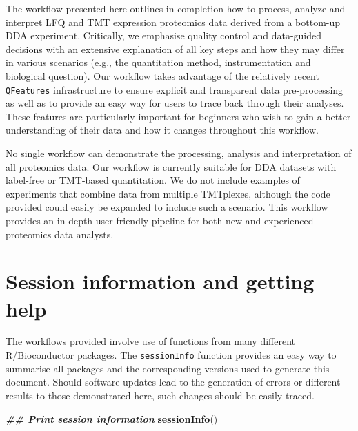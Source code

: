 \documentclass[9pt,a4paper,]{extarticle}
\newenvironment{Shaded}{\begin{snugshade}}{\end{snugshade}}
\newcommand{\DocumentationTok}[1]{\textcolor[rgb]{0.56,0.35,0.01}{\textbf{\textit{#1}}}}
\newcommand{\FunctionTok}[1]{\textcolor[rgb]{0.13,0.29,0.53}{\textbf{#1}}}
\newcommand{\NormalTok}[1]{#1}
\begin{document}
The workflow presented here outlines in completion how to process, analyze and
interpret LFQ and TMT expression proteomics data derived from a bottom-up DDA
experiment. Critically, we emphasise quality control and data-guided decisions
with an extensive explanation of all key steps and how they may differ in
various scenarios (e.g., the quantitation method, instrumentation and biological
question). Our workflow takes advantage of the relatively recent \texttt{QFeatures}
infrastructure to ensure explicit and transparent data pre-processing as well as
to provide an easy way for users to trace back through their analyses. These
features are particularly important for beginners who wish to gain a better
understanding of their data and how it changes throughout this workflow.

No single workflow can demonstrate the processing, analysis and interpretation
of all proteomics data. Our workflow is currently suitable for DDA datasets with
label-free or TMT-based quantitation. We do not include examples of experiments
that combine data from multiple TMTplexes, although the code provided could
easily be expanded to include such a scenario. This workflow provides an in-depth
user-friendly pipeline for both new and experienced proteomics data analysts.

\section{Session information and getting help}\label{session-information-and-getting-help}

The workflows provided involve use of functions from many different
R/Bioconductor packages. The \texttt{sessionInfo} function provides an easy way to
summarise all packages and the corresponding versions used to generate this
document. Should software updates lead to the generation of errors or different
results to those demonstrated here, such changes should be easily traced.

\begin{Shaded}
\begin{Highlighting}[]
\DocumentationTok{\#\# Print session information}
\FunctionTok{sessionInfo}\NormalTok{()}
\end{Highlighting}
\end{Shaded}
\end{document}
